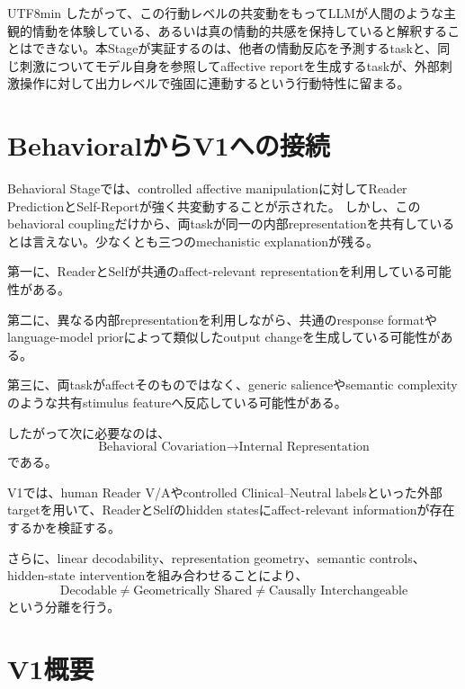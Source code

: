 \documentclass{article} %
\begin{document}
\begin{CJK*}{UTF8}{min}
したがって、この行動レベルの共変動をもってLLMが人間のような主観的情動を体験している、あるいは真の情動的共感を保持していると解釈することはできない。本Stageが実証するのは、他者の情動反応を予測するtaskと、同じ刺激についてモデル自身を参照してaffective reportを生成するtaskが、外部刺激操作に対して出力レベルで強固に連動するという行動特性に留まる。


\section{BehavioralからV1への接続}
\label{sec:behavioral-to-v1}

Behavioral Stageでは、controlled affective manipulationに対してReader PredictionとSelf-Reportが強く共変動することが示された。
しかし、このbehavioral couplingだけから、両taskが同一の内部representationを共有しているとは言えない。少なくとも三つのmechanistic explanationが残る。

第一に、ReaderとSelfが共通のaffect-relevant representationを利用している可能性がある。

第二に、異なる内部representationを利用しながら、共通のresponse formatやlanguage-model priorによって類似したoutput changeを生成している可能性がある。

第三に、両taskがaffectそのものではなく、generic salienceやsemantic complexityのような共有stimulus featureへ反応している可能性がある。

したがって次に必要なのは、
\[
\text{Behavioral Covariation}
\rightarrow
\text{Internal Representation}
\]
である。

V1では、human Reader V/Aやcontrolled Clinical--Neutral labelsといった外部targetを用いて、ReaderとSelfのhidden statesにaffect-relevant informationが存在するかを検証する。

さらに、linear decodability、representation geometry、semantic controls、hidden-state interventionを組み合わせることにより、
\[
\text{Decodable}
\neq
\text{Geometrically Shared}
\neq
\text{Causally Interchangeable}
\]
という分離を行う。


\section{V1概要}
\label{app:v1-methods}


\end{CJK*}
\end{document}
